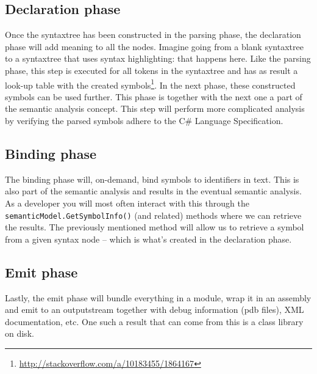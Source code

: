 \subsection{Declaration phase}
\label{sec:declaration-phase}

Once the \gls{syntaxtree} has been constructed in the parsing phase, the declaration phase will add meaning to all the nodes. Imagine going from a blank \gls{syntaxtree} to a \gls{syntaxtree} that uses syntax highlighting: that happens here. Like the parsing phase, this step is executed for all tokens in the \gls{syntaxtree} and has as result a look-up table with the created symbols\footnote{\url{http://stackoverflow.com/a/10183455/1864167}}. In the next phase, these constructed symbols can be used further. This phase is together with the next one a part of the semantic analysis concept. This step will perform more complicated analysis by verifying the parsed symbols adhere to the C\# Language Specification.

\subsection{Binding phase}
\label{sec:binding-phase}

The binding phase will, on-demand, bind symbols to identifiers in text. This is also part of the semantic analysis and results in the eventual semantic analysis. As a developer you will most often interact with this through the \texttt{semanticModel.GetSymbolInfo()} (and related) methods where we can retrieve the results. The previously mentioned method will allow us to retrieve a symbol from a given syntax node -- which is what's created in the declaration phase.

\subsection{Emit phase}
\label{sec:emit-phase}

Lastly, the emit phase will bundle everything in a module, wrap it in an assembly and emit to an outputstream together with debug information (\gls{pdb} files), XML documentation, etc. One such a result that can come from this is a class library on disk.